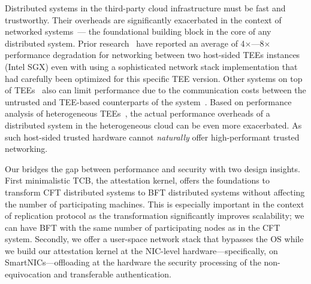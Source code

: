 



 Distributed systems in the third-party cloud infrastructure must be fast and trustworthy. Their overheads are significantly exacerbated in the context of networked systems~\cite{avocado, treaty, minBFT,10.1145/3492321.3519568}--- the foundational building block in the core of any distributed system. Prior research~\cite{avocado} have reported an average of 4$\times$---8$\times$ performance degradation for networking between two host-sided TEEs instances (Intel SGX) even with using a sophisticated network stack implementation that had carefully been optimized for this specific TEE version. Other systems on top of TEEs~\cite{10.1145/3492321.3519568, hybster, minBFT} also can limit performance due to the communication costs between the untrusted and TEE-based counterparts of the system~\cite{10.1145/2168836.2168866}. Based on performance analysis of heterogeneous TEEs~\cite{9460547, 9935045}, the actual performance overheads of a distributed system in the heterogeneous cloud can be even more exacerbated. As such host-sided trusted hardware cannot {\em naturally} offer high-performant trusted networking. 

 Our \projecttitle{} bridges the gap between performance and security with two design insights. First \projecttitle{} minimalistic TCB, the attestation kernel, offers the foundations to transform CFT distributed systems to BFT distributed systems without affecting the number of participating machines. This is especially important in the context of replication protocol as the transformation significantly improves scalability; we can have BFT with the same number of participating nodes as in the CFT system. Secondly, we offer a user-space network stack that bypasses the OS while we build our attestation kernel at the NIC-level hardware---specifically, on SmartNICs---offloading at the hardware the security processing of the non-equivocation and transferable authentication. 

